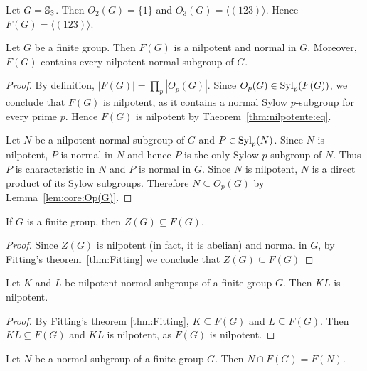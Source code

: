 \begin{example}
Let $G=\mathbb{S}_3$. Then $O_2(G)=\{1\}$ and $O_3(G)=\langle
(123)\rangle$. Hence $F(G)=\langle (123)\rangle$.
\end{example}

\begin{theorem}[Fitting]
\label{thm:Fitting}
Let $G$ be a finite group. Then $F(G)$ is a nilpotent and normal in $G$.
Moreover, $F(G)$ contains every nilpotent normal subgroup of $G$.
\end{theorem}

\begin{proof}
By definition, $|F(G)|=\prod_p|O_p(G)|$.
Since $O_p(G)\in\mathrm{Syl}_p(F(G))$, we conclude that $F(G)$ is nilpotent, as it contains 
a normal Sylow $p$-subgroup for every prime $p$. 
Hence $F(G)$ is nilpotent by Theorem~\ref{thm:nilpotente:eq}.

Let $N$ be a nilpotent normal subgroup of $G$ and $P\in\mathrm{Syl}_p(N)$. Since 
$N$ is nilpotent, $P$ is normal in $N$ and hence $P$ is the only 
Sylow $p$-subgroup of $N$. Thus $P$ is characteristic in $N$ and 
$P$ is normal in $G$. Since $N$ is nilpotent, $N$ is a direct product of its Sylow subgroups. 
Therefore $N\subseteq O_p(G)$ by Lemma~\ref{lem:core:Op(G)}.
\end{proof}

\begin{corollary}
\label{cor:Z(G)subsetF(G)}
If $G$ is a finite group, then $Z(G)\subseteq F(G)$.
\end{corollary}

\begin{proof}
Since $Z(G)$ is nilpotent (in fact, it is abelian) and 
normal in $G$, by Fitting's theorem~\ref{thm:Fitting} we conclude that 
$Z(G)\subseteq F(G)$ 
\end{proof}

\begin{corollary}[Fitting]
\label{cor:Fitting}
Let $K$ and $L$ be nilpotent normal subgroups of a finite group $G$. 
Then $KL$ is nilpotent. 
\end{corollary}

\begin{proof}
By Fitting's theorem \ref{thm:Fitting}, $K\subseteq F(G)$ and 
$L\subseteq F(G)$. Then $KL\subseteq F(G)$ and $KL$ is nilpotent, as 
$F(G)$ is nilpotent. 
\end{proof}

\begin{corollary}
\label{cor:McapF(G)}
Let $N$ be a normal subgroup of a finite group $G$. Then 
$N\cap F(G)=F(N)$.
\end{corollary}


